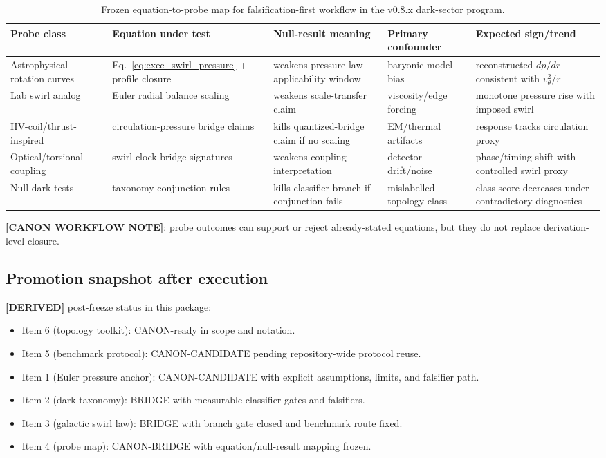 \begin{table}[h]
\centering
\begin{tabular}{p{2.7cm}p{3.1cm}p{2.5cm}p{2.2cm}p{2.2cm}}
\hline
Probe class & Equation under test & Null-result meaning & Primary confounder & Expected sign/trend \\
\hline
Astrophysical rotation curves & Eq.~\eqref{eq:exec_swirl_pressure} + profile closure & weakens pressure-law applicability window & baryonic-model bias & reconstructed $dp/dr$ consistent with $v_\theta^2/r$ \\
Lab swirl analog & Euler radial balance scaling & weakens scale-transfer claim & viscosity/edge forcing & monotone pressure rise with imposed swirl \\
HV-coil/thrust-inspired & circulation-pressure bridge claims & kills quantized-bridge claim if no scaling & EM/thermal artifacts & response tracks circulation proxy \\
Optical/torsional coupling & swirl-clock bridge signatures & weakens coupling interpretation & detector drift/noise & phase/timing shift with controlled swirl proxy \\
Null dark tests & taxonomy conjunction rules & kills classifier branch if conjunction fails & mislabelled topology class & class score decreases under contradictory diagnostics \\
\hline
\end{tabular}
\caption{Frozen equation-to-probe map for falsification-first workflow in the v0.8.x dark-sector program.}
\label{tab:exec-probe-map}
\end{table}

\textbf{[CANON WORKFLOW NOTE]}: probe outcomes can support or reject already-stated equations, but they do not replace derivation-level closure.

\subsection{Promotion snapshot after execution}
\textbf{[DERIVED]} post-freeze status in this package:
\begin{itemize}
    \item Item 6 (topology toolkit): CANON-ready in scope and notation.
    \item Item 5 (benchmark protocol): CANON-CANDIDATE pending repository-wide protocol reuse.
    \item Item 1 (Euler pressure anchor): CANON-CANDIDATE with explicit assumptions, limits, and falsifier path.
    \item Item 2 (dark taxonomy): BRIDGE with measurable classifier gates and falsifiers.
    \item Item 3 (galactic swirl law): BRIDGE with branch gate closed and benchmark route fixed.
    \item Item 4 (probe map): CANON-BRIDGE with equation/null-result mapping frozen.
\end{itemize}

